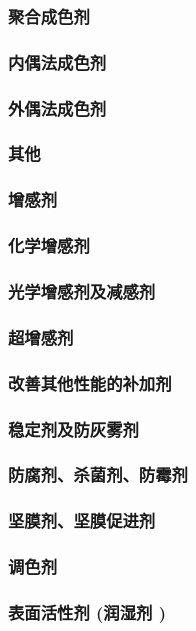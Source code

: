 \documentclass[UTF8]{../../ApplicationUniverse}
\begin{document}
            \subsubsection{聚合成色剂}
            \subsubsection{内偶法成色剂}
            \subsubsection{外偶法成色剂}
            \subsubsection{其他}
    \subsubsection{增感剂}
        \subsubsection{化学增感剂}
        \subsubsection{光学增感剂及减感剂}
        \subsubsection{超增感剂}
    \subsubsection{改善其他性能的补加剂}
        \subsubsection{稳定剂及防灰雾剂}
        \subsubsection{防腐剂、杀菌剂、防霉剂}
        \subsubsection{坚膜剂、坚膜促进剂}
        \subsubsection{调色剂}
        \subsubsection{表面活性剂 (润湿剂 )}
\end{document}
